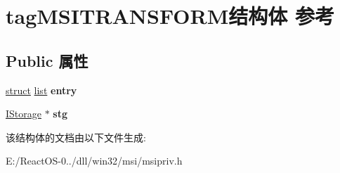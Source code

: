 \hypertarget{structtag_m_s_i_t_r_a_n_s_f_o_r_m}{}\section{tag\+M\+S\+I\+T\+R\+A\+N\+S\+F\+O\+R\+M结构体 参考}
\label{structtag_m_s_i_t_r_a_n_s_f_o_r_m}
\subsection*{Public 属性}
\begin{DoxyCompactItemize}
\item 
\mbox{\label{structtag_m_s_i_t_r_a_n_s_f_o_r_m_aa0169f9fb3341fffd113da2636253f7c}} 
\hyperlink{interfacestruct}{struct} \hyperlink{classlist}{list} {\bfseries entry}
\item 
\mbox{\label{structtag_m_s_i_t_r_a_n_s_f_o_r_m_a705c9ccf6d13017fdedc1165c28c3afa}} 
\hyperlink{interface_i_storage}{I\+Storage} $\ast$ {\bfseries stg}
\end{DoxyCompactItemize}


该结构体的文档由以下文件生成\+:\begin{DoxyCompactItemize}
\item 
E\+:/\+React\+O\+S-\/0../dll/win32/msi/msipriv.\+h\end{DoxyCompactItemize}

